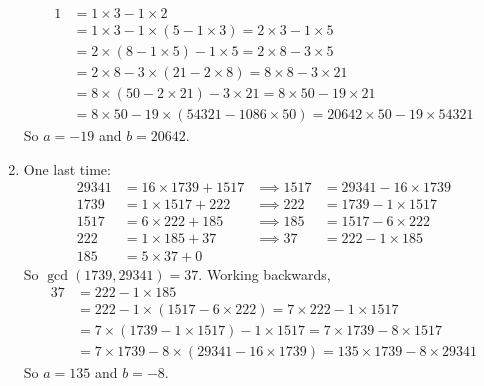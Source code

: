\documentclass{article}
\theoremstyle{definition}
\begin{document}
\begin{solution}
\begin{enumerate}
\begin{align*}
                1 &= 1\times 3 - 1 \times 2 \\
                  &= 1\times 3 - 1 \times (5 - 1 \times 3)
                   = 2 \times 3 - 1 \times 5 \\
                  &= 2 \times (8 - 1 \times 5) - 1 \times 5
                   = 2 \times 8 - 3 \times 5 \\
                  &= 2 \times 8 - 3 \times (21 - 2 \times 8)
                   = 8 \times 8 - 3 \times 21 \\
                  &= 8 \times (50 - 2 \times 21) - 3 \times 21
                   = 8 \times 50 - 19 \times 21 \\
                  &= 8 \times 50 - 19 \times (54321 - 1086 \times 50)
                   = 20642 \times 50 - 19 \times 54321
            \end{align*}
            So $a=-19$ and $b=20642$.
        \item One last time:
            \begin{align*}
                29341 &= 16 \times 1739 + 1517
                 &\implies 1517 &= 29341 - 16 \times 1739 \\
                 1739 &= 1 \times 1517 + 222
                 &\implies  222 &= 1739 - 1 \times 1517 \\
                 1517 &= 6 \times 222 + 185
                 &\implies  185 &= 1517 - 6 \times 222 \\
                  222 &= 1 \times 185 + 37
                  &\implies  37 &= 222 - 1 \times 185 \\
                  185 &= 5 \times 37 + 0
            \end{align*}
            So $\gcd(1739,29341) = 37$.  Working backwards,
            \begin{align*}
                37 &= 222 - 1 \times 185 \\
                   &= 222 - 1 \times (1517 - 6 \times 222)
                    = 7 \times 222 - 1 \times 1517 \\
                   &= 7 \times (1739 - 1 \times 1517) - 1 \times 1517
                    = 7 \times 1739 - 8 \times 1517 \\
                   &= 7 \times 1739 - 8 \times (29341 - 16 \times 1739)
                    = 135 \times 1739 - 8 \times 29341
            \end{align*}
            So $a=135$ and $b=-8$.
    \end{enumerate}
\end{solution}
\end{document}
